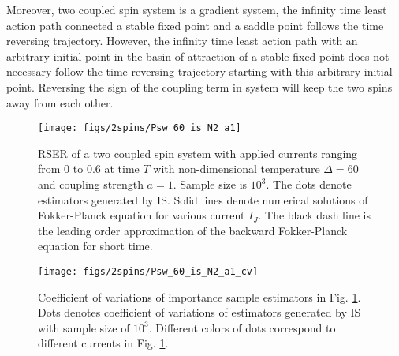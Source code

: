 \documentclass[journal,transmag]{IEEEtran}
\begin{document}
Moreover, two coupled spin system is a gradient system, the infinity time least action path connected a stable fixed point and a saddle point follows the time reversing trajectory. However, the infinity time least action path with an arbitrary initial point in the basin of attraction of a stable fixed point does not necessary follow the time reversing trajectory starting with this arbitrary initial point. Reversing the sign of the coupling term in system will keep the two spins away from each other.   
\begin{figure}[h]
   \centering
         \texttt{[image: figs/2spins/Psw\_60\_is\_N2\_a1]}   
   \caption{RSER of a two coupled spin system with applied currents ranging from $0$ to $0.6$ at time $T$ with non-dimensional temperature $\Delta = 60$ and coupling strength $ a = 1$. Sample size is $10^3$. The dots denote estimators generated by IS. Solid lines denote numerical solutions of Fokker-Planck equation for various current $I_J$. The black dash line is the leading order approximation of the backward Fokker-Planck equation for short time.}
   \label{figs:ISvsMC1_0}
\end{figure}
\begin{figure}[h]
   \centering
         \texttt{[image: figs/2spins/Psw\_60\_is\_N2\_a1\_cv]}   
   \caption{Coefficient of variations of importance sample estimators in Fig. \ref{figs:ISvsMC1_0}. Dots denotes coefficient of variations  of estimators generated by IS with sample size of $10^3$. Different colors of dots correspond to different currents in Fig. \ref{figs:ISvsMC1_0}.}
   \label{figs:ISvsMC1_0_cv}
\end{figure}
\end{document}
